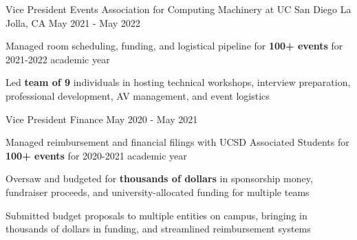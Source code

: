 \begin{cventries}
  \cventrytwo
    {Vice President Events} %
    {Association for Computing Machinery at UC San Diego} %
    {La Jolla, CA} %
    {May 2021 - May 2022} %
    {
      \begin{cvitems} %
        \item {Managed room scheduling, funding, and logistical pipeline for \textbf{100+ events} for 2021-2022 academic year}
        \item {Led \textbf{team of 9} individuals in hosting technical workshops, interview preparation, professional development, AV management, and event logistics}
      \end{cvitems}
    }
    {Vice President Finance}
    {May 2020 - May 2021} %
    {
      \begin{cvitems} %
        \item {Managed reimbursement and financial filings with UCSD Associated Students for \textbf{100+ events} for 2020-2021 academic year}
        \item {Oversaw and budgeted for \textbf{thousands of dollars} in sponsorship money, fundraiser proceeds, and university-allocated funding for multiple teams}
        \item {Submitted budget proposals to multiple entities on campus, bringing in thousands of dollars in funding, and streamlined reimbursement systems}
      \end{cvitems}
    }


\end{cventries}
